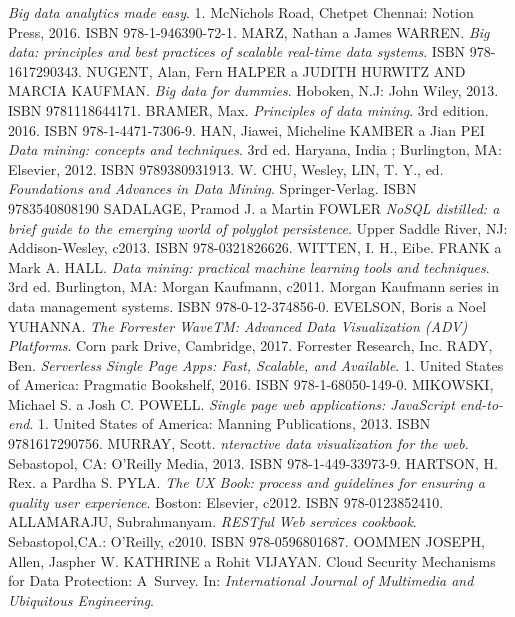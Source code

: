 \begin{thebibliography}{99}
\textit{Big data analytics made easy}.
1. McNichols Road, Chetpet Chennai: Notion Press, 2016. ISBN 978-1-946390-72-1.
MARZ, Nathan a James WARREN.
\textit{Big data: principles and best practices of scalable real-time data systems}.
ISBN 978-1617290343.
NUGENT, Alan, Fern HALPER a JUDITH HURWITZ AND MARCIA KAUFMAN.
\textit{Big data for dummies}.
Hoboken, N.J: John Wiley, 2013. ISBN 9781118644171.
BRAMER, Max.
\textit{Principles of data mining}.
3rd edition. 2016. ISBN 978-1-4471-7306-9.
HAN, Jiawei, Micheline KAMBER a Jian PEI
\textit{Data mining: concepts and techniques}.
3rd ed. Haryana, India ; Burlington, MA: Elsevier, 2012. ISBN 9789380931913.
W. CHU, Wesley, LIN, T. Y., ed.
\textit{Foundations and Advances in Data Mining}.
Springer-Verlag. ISBN 9783540808190
SADALAGE, Pramod J. a Martin FOWLER
\textit{NoSQL distilled: a brief guide to the emerging world of polyglot persistence}.
Upper Saddle River, NJ: Addison-Wesley, c2013. ISBN 978-0321826626.
WITTEN, I. H., Eibe. FRANK a Mark A. HALL.
\textit{Data mining: practical machine learning tools and techniques}.
3rd ed. Burlington, MA: Morgan Kaufmann, c2011. Morgan Kaufmann series in data management systems. ISBN 978-0-12-374856-0.
EVELSON, Boris a Noel YUHANNA.
\textit{The Forrester WaveTM: Advanced Data Visualization (ADV) Platforms}.
Corn park Drive, Cambridge, 2017. Forrester Research, Inc.
RADY, Ben.
\textit{Serverless Single Page Apps: Fast, Scalable, and Available}.
1. United States of America: Pragmatic Bookshelf, 2016. ISBN 978-1-68050-149-0.
MIKOWSKI, Michael S. a Josh C. POWELL.
\textit{Single page web applications: JavaScript end-to-end}.
1. United States of America: Manning Publications, 2013. ISBN 9781617290756.
MURRAY, Scott.
\textit{nteractive data visualization for the web}.
Sebastopol, CA: O'Reilly Media, 2013. ISBN 978-1-449-33973-9.
HARTSON, H. Rex. a Pardha S. PYLA.
\textit{The UX Book: process and guidelines for ensuring a quality user experience}.
Boston: Elsevier, c2012. ISBN 978-0123852410.
ALLAMARAJU, Subrahmanyam.
\textit{RESTful Web services cookbook}.
Sebastopol,CA.: O'Reilly, c2010. ISBN 978-0596801687.
OOMMEN JOSEPH, Allen, Jaspher W. KATHRINE a Rohit VIJAYAN.
Cloud Security Mechanisms for Data Protection: A~Survey. In: \textit{International Journal of Multimedia and Ubiquitous Engineering}.

\end{thebibliography}
